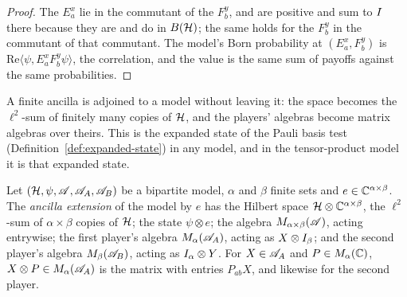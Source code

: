 \begin{proof}
\leanok
The $E^x_a$ lie in the commutant of the $F^y_b$, and are positive and sum to $I$ there because
they are and do in $B(\mathcal{H})$; the same holds for the $F^y_b$ in the commutant of that commutant.
The model's Born probability at $(E^x_a, F^y_b)$ is
$\mathrm{Re}\langle \psi, E^x_a F^y_b \psi\rangle$, the correlation, and the value is the same
sum of payoffs against the same probabilities.
\end{proof}

A finite ancilla is adjoined to a model without leaving it: the space becomes the $\ell^2$-sum of
finitely many copies of $\mathcal{H}$, and the players' algebras become matrix algebras over theirs. This
is the expanded state of the Pauli basis test (Definition~\ref{def:expanded-state}) in any model,
and in the tensor-product model it is that expanded state.

\begin{definition}
\label{def:ancilla-extension}
\leanok
Let $(\mathcal{H}, \psi, \mathscr{A}, \mathscr{A}_A, \mathscr{A}_B)$ be a bipartite model, $\alpha$ and $\beta$ finite sets
and $e \in \mathbb{C}^{\alpha \times \beta}$. The \emph{ancilla extension} of the model by $e$ has the
Hilbert space $\mathcal{H} \otimes \mathbb{C}^{\alpha \times \beta}$, the $\ell^2$-sum of $\alpha \times \beta$
copies of $\mathcal{H}$; the state $\psi \otimes e$; the algebra $M_{\alpha \times \beta}(\mathscr{A})$, acting
entrywise; the first player's algebra $M_\alpha(\mathscr{A}_A)$, acting as $X \otimes I_\beta$; and
the second player's algebra $M_\beta(\mathscr{A}_B)$, acting as $I_\alpha \otimes Y$. For $X \in \mathscr{A}_A$
and $P \in M_\alpha(\mathbb{C})$, $X \otimes P \in M_\alpha(\mathscr{A}_A)$ is the matrix with entries
$P_{ab} X$, and likewise for the second player.
\end{definition}

